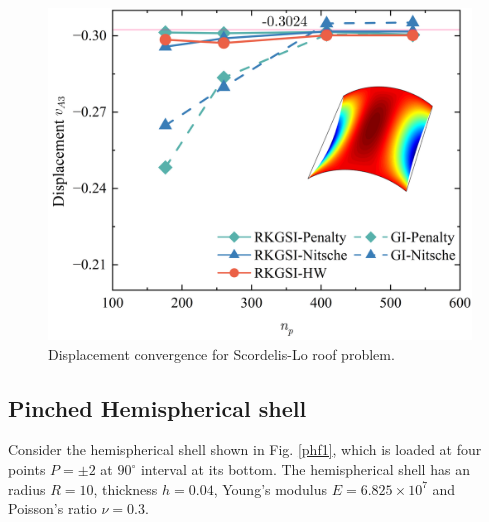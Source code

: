 \begin{figure}[!ht]
\centering
\DIFdelbeginFL %
\DIFdelendFL \DIFaddbeginFL \includegraphics[width=\textwidth]{figures/sld_r1}
\DIFaddendFL \caption{Displacement convergence for Scordelis-Lo roof problem.}\label{slf4}
\end{figure}

\subsection{Pinched Hemispherical shell}
Consider the hemispherical shell shown in Fig. \ref{phf1}, which is loaded at four points $P=\pm 2$ at $90^\circ$ interval at its bottom. The hemispherical shell has an radius $R=10$, thickness $h=0.04$, Young's modulus $E=6.825\times10^7$ and Poisson's ratio $\nu = 0.3$.

